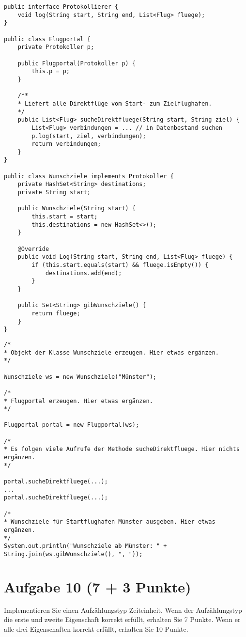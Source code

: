 \begin{lstlisting}
public interface Protokollierer {
    void log(String start, String end, List<Flug> fluege);
}

public class Flugportal {
    private Protokoller p;

    public Flugportal(Protokoller p) {
        this.p = p;
    }

    /**
    * Liefert alle Direktflüge vom Start- zum Zielflughafen.
    */
    public List<Flug> sucheDirektfluege(String start, String ziel) {
        List<Flug> verbindungen = ... // in Datenbestand suchen
        p.log(start, ziel, verbindungen);    
        return verbindungen;
    }
}

public class Wunschziele implements Protokoller {
    private HashSet<String> destinations;
    private String start;

    public Wunschziele(String start) {
        this.start = start;
        this.destinations = new HashSet<>();
    }

    @Override
    public void Log(String start, String end, List<Flug> fluege) {
        if (this.start.equals(start) && fluege.isEmpty()) {
            destinations.add(end);
        }
    }

    public Set<String> gibWunschziele() {
        return fluege;
    }
}
\end{lstlisting}

\begin{lstlisting}
/*
* Objekt der Klasse Wunschziele erzeugen. Hier etwas ergänzen.
*/

Wunschziele ws = new Wunschziele("Münster");

/*
* Flugportal erzeugen. Hier etwas ergänzen.
*/

Flugportal portal = new Flugportal(ws);

/*
* Es folgen viele Aufrufe der Methode sucheDirektfluege. Hier nichts ergänzen.
*/

portal.sucheDirektfluege(...);
...
portal.sucheDirektfluege(...);

/*
* Wunschziele für Startflughafen Münster ausgeben. Hier etwas ergänzen.
*/
System.out.println("Wunschziele ab Münster: " + String.join(ws.gibWunschziele(), ", "));
\end{lstlisting}

\section{Aufgabe 10 (7 + 3 Punkte)}
Implementieren Sie einen Aufzählungstyp Zeiteinheit. Wenn der Aufzählungstyp
die erste und zweite Eigenschaft korrekt erfüllt, erhalten Sie 7 Punkte. Wenn
er alle drei Eigenschaften korrekt erfüllt, erhalten Sie 10 Punkte.

